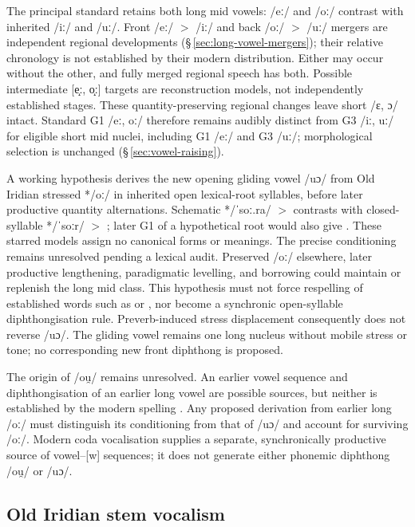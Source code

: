 The principal standard retains both long mid vowels:  /eː/ and
 /oː/ contrast with inherited  /iː/ and  /uː/.
Front /eː/ $>$ /iː/ and back /oː/ $>$ /uː/ mergers are independent
regional developments (§\,\ref{sec:long-vowel-mergers}); their relative
chronology is not established by their modern distribution. Either may
occur without the other, and fully merged regional speech has both.
Possible intermediate [e̝ː, o̝ː] targets are reconstruction models, not
independently established stages. These quantity-preserving regional
changes leave short /ɛ, ɔ/ intact. Standard G1 /eː, oː/ therefore remains
audibly distinct from G3 /iː, uː/ for eligible short mid nuclei, including
G1  /eː/ and G3  /uː/; morphological selection
is unchanged (§\,\ref{sec:vowel-raising}).

A working hypothesis derives the new opening gliding vowel /uɔ/ from
Old Iridian stressed */oː/ in inherited open lexical-root syllables,
before later productive quantity alternations. Schematic */ˈsoː.ra/ $>$
 contrasts with closed-syllable */ˈsoːr/ $>$ ;
later G1 of a hypothetical  root would also give .
These starred models assign no canonical forms or meanings. The precise
conditioning remains unresolved pending a lexical audit. Preserved /oː/
elsewhere, later productive lengthening, paradigmatic levelling, and
borrowing could maintain or replenish the long mid class. This hypothesis
must not force respelling of established words such as  or
, nor become a synchronic open-syllable diphthongisation rule.
Preverb-induced stress displacement consequently does not reverse /uɔ/.
The gliding vowel remains one long nucleus without mobile stress or tone;
no corresponding new front diphthong is proposed.

The origin of /ou̯/ remains unresolved. An earlier vowel sequence and
diphthongisation of an earlier long vowel are possible sources, but neither
is established by the modern spelling . Any proposed derivation
from earlier long /oː/ must distinguish its conditioning from that of
/uɔ/ and account for surviving /oː/. Modern coda vocalisation supplies a
separate, synchronically productive source of vowel--[w] sequences; it
does not generate either phonemic diphthong /ou̯/ or /uɔ/.

\subsection{Old Iridian stem vocalism}\label{sec:old-iridian-vocalism}

